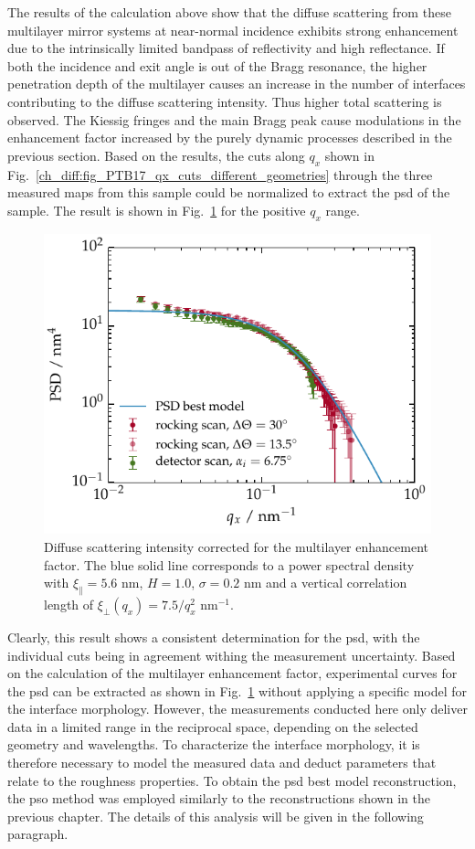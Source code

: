 The results of the calculation above show that the diffuse scattering from these multilayer mirror systems at near-normal incidence exhibits strong enhancement due to the intrinsically limited bandpass of reflectivity and high reflectance. If both the incidence and exit angle is out of the Bragg resonance, the higher penetration depth of the multilayer causes an increase in the number of interfaces contributing to the diffuse scattering intensity. Thus higher total scattering is observed. The Kiessig fringes and the main Bragg peak cause modulations in the enhancement factor increased by the purely dynamic processes described in the previous section. Based on the results, the cuts along $q_x$ shown in Fig.~\ref{ch_diff:fig_PTB17_qx_cuts_different_geometries} through the three measured maps from this sample could be normalized to extract the \gls{psd} of the sample. The result is shown in Fig.~\ref{ch_diff:PTB17_PSD_for_all_geometries} for the positive $q_x$ range.
\begin{figure}[htbp]
	\includegraphics{img/PTB17_PSD_for_all_geometries} \caption{Diffuse scattering intensity corrected for the multilayer enhancement factor. The blue solid line corresponds to a power spectral density with $\xi_\parallel=5.6$ nm, $H=1.0$, $\sigma=0.2$ nm and a vertical correlation length of $\xi_\perp(q_x)=7.5/q_x^2$ nm$^{-1}$.} \label{ch_diff:PTB17_PSD_for_all_geometries} 
\end{figure}
Clearly, this result shows a consistent determination for the \gls{psd}, with the individual cuts being in agreement withing the measurement uncertainty. Based on the calculation of the multilayer enhancement factor, experimental curves for the \gls{psd} can be extracted as shown in Fig.~\ref{ch_diff:PTB17_PSD_for_all_geometries} without applying a specific model for the interface morphology. However, the measurements conducted here only deliver data in a limited range in the reciprocal space, depending on the selected geometry and wavelengths. To characterize the interface morphology, it is therefore necessary to model the measured data and deduct parameters that relate to the roughness properties. To obtain the \gls{psd} best model reconstruction, the \gls{pso} method was employed similarly to the reconstructions shown in the previous chapter. The details of this analysis will be given in the following paragraph.


